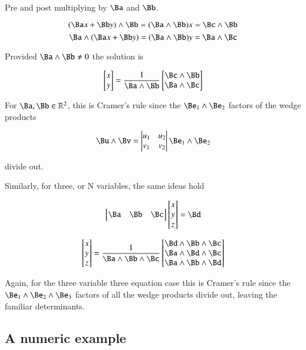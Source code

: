 Pre and post multiplying by $\Ba$ and $\Bb$.

\[
      ( \Ba x + \Bb y ) \wedge \Bb = (\Ba \wedge \Bb) x =       \Bc \wedge \Bb
\]
\[
\Ba \wedge ( \Ba x + \Bb y )       = (\Ba \wedge \Bb) y = \Ba \wedge \Bc      
\]

Provided $\Ba \wedge \Bb \neq 0$ the solution is

\[
\begin{bmatrix}x \\ y\end{bmatrix}
= \frac{1}{\Ba \wedge \Bb}
\begin{bmatrix}
\Bc \wedge \Bb \\ \Ba \wedge \Bc
\end{bmatrix}
\]

For $\Ba, \Bb \in {\mathbb R}^2$, this is Cramer's rule since the $\Be _1 \wedge \Be _2$ factors of the wedge products

\[
\Bu \wedge \Bv = \begin{vmatrix}u_1 & u_2 \\ v_1 & v_2 \end{vmatrix} \Be _1 \wedge \Be _2
\]

divide out.

Similarly, for three, or N variables, the same ideas hold

\[
\begin{bmatrix}
\Ba & \Bb & \Bc
\end{bmatrix}
\begin{bmatrix}
x \\ y \\ z
\end{bmatrix}
= \Bd
\]

\[
\begin{bmatrix}
x \\ y \\ z
\end{bmatrix}
= \frac{1}{\Ba \wedge \Bb \wedge \Bc}
\begin{bmatrix}
\Bd \wedge \Bb \wedge \Bc \\
\Ba \wedge \Bd \wedge \Bc \\
\Ba \wedge \Bb \wedge \Bd
\end{bmatrix}
\]

Again, for the three variable three equation case this is Cramer's rule since the $\Be _1 \wedge \Be _2 \wedge \Be _3$ factors of all the wedge products divide out, leaving the familiar determinants.

\subsection{A numeric example}

